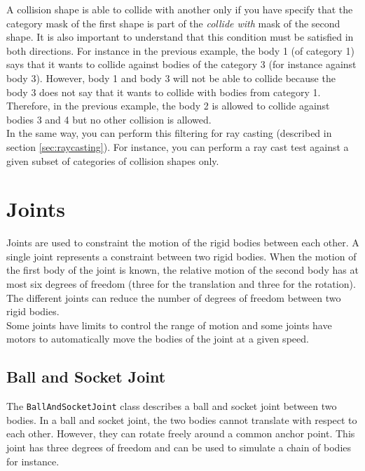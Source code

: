 \documentclass[a4paper,12pt]{article}
\begin{document}
    A collision shape is able to collide with another only if you have specify that the category mask of the first shape is part of the \emph{collide with} mask of the second shape. It
    is also important to understand that this condition must be satisfied in both directions. For instance in the previous example, the body 1 (of category 1) says that it wants to collide
    against bodies of the category 3 (for instance against body 3). However, body 1 and body 3 will not be able to collide because the body 3 does not say that it wants to collide
    with bodies from category 1. Therefore, in the previous example, the body 2 is allowed to collide against bodies 3 and 4 but no other collision is allowed. \\

    In the same way, you can perform this filtering for ray casting (described in section \ref{sec:raycasting}). For instance, you can perform a ray cast test
    against a given subset of categories of collision shapes only.

    \section{Joints}

    Joints are used to constraint the motion of the rigid bodies between each other. A single joint represents a constraint between two rigid bodies.
    When the motion of the first body of the joint is known, the relative motion of the second body has at most six degrees of freedom (three for the
    translation and three for the rotation). The different joints can reduce the number of degrees of freedom between two rigid bodies. \\

    Some joints have limits to control the range of motion and some joints have motors to automatically move the bodies of the joint at a given speed. \\

    \subsection{Ball and Socket Joint}

    The \texttt{BallAndSocketJoint} class describes a ball and socket joint between two bodies. In a ball and socket joint, the two bodies cannot translate with respect to each other.
    However, they can rotate freely around a common anchor point. This joint has three degrees of freedom and can be used to simulate a chain of bodies for instance. \\
\end{document}
